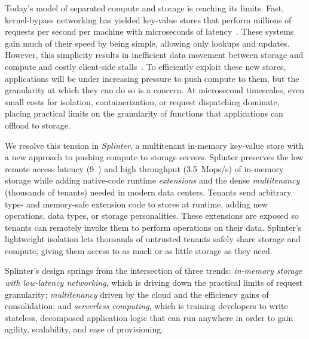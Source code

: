 Today's model of separated compute and storage is reaching its limits.  Fast,
  kernel-bypass networking has yielded key-value stores that perform
  millions of requests per second per machine with microseconds of
  latency~\cite{farm-2014,fasst-2016,mica,ramcloud,drtm}.
These systems gain much of their speed by being simple, allowing only lookups
  and updates.
However, this simplicity results in inefficient data movement between storage and
  compute and costly client-side stalls~\cite{killer-microseconds,grappa}.
To efficiently exploit these new stores, applications will be under
  increasing pressure to push compute to them, but the granularity at which
  they can do so is a concern.
At microsecond timescales, even small costs for isolation, containerization, or
  request dispatching dominate, placing practical limits on the granularity of
  functions that applications can offload to storage.

We resolve this tension in \textsl{Splinter}, a multitenant in-memory key-value store with
  a new approach to pushing compute to storage servers.
Splinter preserves the low remote access latency (9~\us) and high throughput (3.5~Mops/s)
  of in-memory storage
  while adding native-code runtime \textsl{extensions} and the dense
  \textsl{multitenancy} (thousands of tenants) needed in modern data centers.
Tenants send arbitrary type- and memory-safe extension code to
  stores at runtime, adding new operations, data types, or
  storage personalities.
These extensions are exposed so tenants can remotely
  invoke them to perform operations on
  their data.
Splinter's lightweight isolation lets thousands of untrusted tenants
  safely share storage and compute, giving them access to as
  much or as little storage as they need.

Splinter's design springs from the intersection of three trends:
  \textsl{in-memory storage with low-latency networking}, which is driving down
  the practical limits of request granularity;
\textsl{multitenancy} driven by the cloud and the efficiency gains of
  consolidation;
and \textsl{serverless computing}, which is training developers to
  write stateless, decomposed application logic that can run anywhere in order to gain agility,
  scalability, and ease of provisioning.

